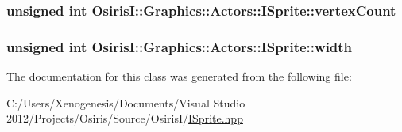 \hypertarget{class_osiris_i_1_1_graphics_1_1_actors_1_1_i_sprite_a438ae426c13697237a0284686d3a8481}{
\subsubsection[{vertex\-Count}]{\setlength{\rightskip}{0pt plus 5cm}unsigned int Osiris\-I\-::\-Graphics\-::\-Actors\-::\-I\-Sprite\-::vertex\-Count\hspace{0.3cm}{\ttfamily [protected]}}}\label{class_osiris_i_1_1_graphics_1_1_actors_1_1_i_sprite_a438ae426c13697237a0284686d3a8481}
\hypertarget{class_osiris_i_1_1_graphics_1_1_actors_1_1_i_sprite_a4d463bbb08fdf10f2de2298467383faa}{
\subsubsection[{width}]{\setlength{\rightskip}{0pt plus 5cm}unsigned int Osiris\-I\-::\-Graphics\-::\-Actors\-::\-I\-Sprite\-::width\hspace{0.3cm}{\ttfamily [protected]}}}\label{class_osiris_i_1_1_graphics_1_1_actors_1_1_i_sprite_a4d463bbb08fdf10f2de2298467383faa}


The documentation for this class was generated from the following file\-:\begin{DoxyCompactItemize}
\item 
C\-:/\-Users/\-Xenogenesis/\-Documents/\-Visual Studio 2012/\-Projects/\-Osiris/\-Source/\-Osiris\-I/\hyperlink{_i_sprite_8hpp}{I\-Sprite.\-hpp}\end{DoxyCompactItemize}
